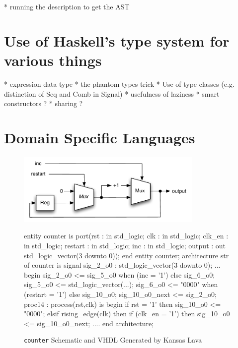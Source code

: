 \documentclass[11pt]{article}
\begin{document}
 * running the description to get the AST 

\section{Use of Haskell’s type system for various things }

 * expression data type 
 * the phantom types trick 
 * Use of type classes (e.g. distinction of Seq and Comb in Signal) 
 * usefulness of laziness 
 * smart constructors ? 
 * sharing ?



\section{Domain Specific Languages}






\begin{figure}[!t]
  \centering
  \begin{minipage}{0.5\textwidth}
    \centering
    \includegraphics[width=0.8\textwidth]{images/Counter.pdf}
  \end{minipage}\begin{minipage}{0.5\textwidth}
     \centering
\footnotesize\begin{Code}[fontsize=\tiny]
entity counter is
  port(rst : in std_logic;
       clk : in std_logic;
       clk_en : in std_logic;
       restart : in std_logic;
       inc : in std_logic;
       output : out std_logic_vector(3 downto 0));
end entity counter;
architecture str of counter is
  signal sig_2_o0 : std_logic_vector(3 downto 0);
  ...
begin
  sig_2_o0 <= sig_5_o0 when (inc = '1')  else sig_6_o0;
  sig_5_o0 <= std_logic_vector(...);
  sig_6_o0 <= "0000" when (restart = '1') else sig_10_o0;
  sig_10_o0_next <= sig_2_o0;
  proc14 : process(rst,clk) is
  begin
    if rst = '1' then
      sig_10_o0 <= "0000";
    elsif rising_edge(clk) then
      if (clk_en = '1') then
        sig_10_o0 <= sig_10_o0_next;
  ....
end architecture;
\end{Code}
  \end{minipage}
  \caption{{\tt counter} Schematic and VHDL Generated by Kansas Lava}
  \label{fig:counter-picture}
\end{figure}
\end{document}
